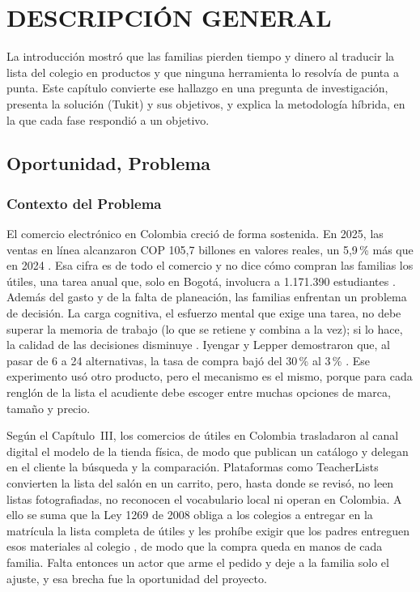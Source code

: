 \setcounter{subsection}{0}
\section{DESCRIPCIÓN GENERAL}

La introducción mostró que las familias pierden tiempo y dinero al traducir la lista del colegio en
productos y que ninguna herramienta lo resolvía de punta a punta. Este capítulo convierte ese hallazgo en
una pregunta de investigación, presenta la solución (Tukit) y sus objetivos, y explica la metodología
híbrida, en la que cada fase respondió a un objetivo.\par

\subsection{Oportunidad, Problema}

\subsubsection{Contexto del Problema}

El comercio electrónico en Colombia creció de forma sostenida. En 2025, las ventas en línea alcanzaron
COP 105,7 billones en valores reales, un 5,9\,\% más que en 2024 \citep{noauthor_informe_nodate-1}. Esa cifra
es de todo el comercio y no dice cómo compran las familias los útiles, una tarea anual que, solo en Bogotá,
involucra a 1.171.390 estudiantes \citep{noauthor_estadisticas_nodate}. Además del gasto y de la falta de
planeación, las familias enfrentan un problema de decisión. La carga cognitiva, el esfuerzo mental que exige
una tarea, no debe superar la memoria de trabajo (lo que se retiene y combina a la vez); si lo hace, la
calidad de las decisiones disminuye \citep{sweller_cognitive_2011}. Iyengar y Lepper demostraron que,
al pasar de 6 a 24 alternativas, la tasa de compra bajó del 30\,\% al 3\,\% \citep{iyengar_when_2000}. Ese
experimento usó otro producto, pero el mecanismo es el mismo, porque para cada renglón de la lista el acudiente
debe escoger entre muchas opciones de marca, tamaño y precio.\par

Según el Capítulo~III, los comercios de útiles en Colombia trasladaron al canal digital el modelo de la
tienda física, de modo que publican un catálogo y delegan en el cliente la búsqueda y la comparación. Plataformas como
TeacherLists convierten la lista del salón en un carrito, pero, hasta donde se revisó, no leen listas
fotografiadas, no reconocen el vocabulario local ni operan en Colombia. A ello se suma que la Ley 1269 de 2008 obliga a los colegios a entregar en la matrícula la lista completa de útiles y les prohíbe exigir que los padres entreguen esos materiales al colegio \citep{congreso_ley1269_2008}, de modo que la compra queda en manos de cada familia. Falta entonces un actor que arme el
pedido y deje a la familia solo el ajuste, y esa brecha fue la oportunidad del proyecto.\par

